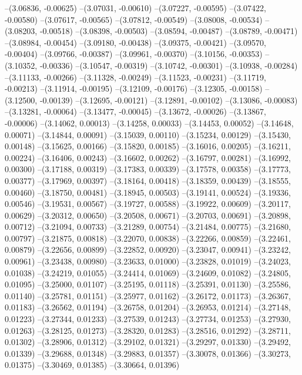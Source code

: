 --(3.06836, -0.00625)
--(3.07031, -0.00610)
--(3.07227, -0.00595)
--(3.07422, -0.00580)
--(3.07617, -0.00565)
--(3.07812, -0.00549)
--(3.08008, -0.00534)
--(3.08203, -0.00518)
--(3.08398, -0.00503)
--(3.08594, -0.00487)
--(3.08789, -0.00471)
--(3.08984, -0.00454)
--(3.09180, -0.00438)
--(3.09375, -0.00421)
--(3.09570, -0.00404)
--(3.09766, -0.00387)
--(3.09961, -0.00370)
--(3.10156, -0.00353)
--(3.10352, -0.00336)
--(3.10547, -0.00319)
--(3.10742, -0.00301)
--(3.10938, -0.00284)
--(3.11133, -0.00266)
--(3.11328, -0.00249)
--(3.11523, -0.00231)
--(3.11719, -0.00213)
--(3.11914, -0.00195)
--(3.12109, -0.00176)
--(3.12305, -0.00158)
--(3.12500, -0.00139)
--(3.12695, -0.00121)
--(3.12891, -0.00102)
--(3.13086, -0.00083)
--(3.13281, -0.00064)
--(3.13477, -0.00045)
--(3.13672, -0.00026)
--(3.13867, -0.00006)
--(3.14062, 0.00013)
--(3.14258, 0.00033)
--(3.14453, 0.00052)
--(3.14648, 0.00071)
--(3.14844, 0.00091)
--(3.15039, 0.00110)
--(3.15234, 0.00129)
--(3.15430, 0.00148)
--(3.15625, 0.00166)
--(3.15820, 0.00185)
--(3.16016, 0.00205)
--(3.16211, 0.00224)
--(3.16406, 0.00243)
--(3.16602, 0.00262)
--(3.16797, 0.00281)
--(3.16992, 0.00300)
--(3.17188, 0.00319)
--(3.17383, 0.00339)
--(3.17578, 0.00358)
--(3.17773, 0.00377)
--(3.17969, 0.00397)
--(3.18164, 0.00418)
--(3.18359, 0.00439)
--(3.18555, 0.00460)
--(3.18750, 0.00481)
--(3.18945, 0.00503)
--(3.19141, 0.00524)
--(3.19336, 0.00546)
--(3.19531, 0.00567)
--(3.19727, 0.00588)
--(3.19922, 0.00609)
--(3.20117, 0.00629)
--(3.20312, 0.00650)
--(3.20508, 0.00671)
--(3.20703, 0.00691)
--(3.20898, 0.00712)
--(3.21094, 0.00733)
--(3.21289, 0.00754)
--(3.21484, 0.00775)
--(3.21680, 0.00797)
--(3.21875, 0.00818)
--(3.22070, 0.00838)
--(3.22266, 0.00859)
--(3.22461, 0.00879)
--(3.22656, 0.00899)
--(3.22852, 0.00920)
--(3.23047, 0.00941)
--(3.23242, 0.00961)
--(3.23438, 0.00980)
--(3.23633, 0.01000)
--(3.23828, 0.01019)
--(3.24023, 0.01038)
--(3.24219, 0.01055)
--(3.24414, 0.01069)
--(3.24609, 0.01082)
--(3.24805, 0.01095)
--(3.25000, 0.01107)
--(3.25195, 0.01118)
--(3.25391, 0.01130)
--(3.25586, 0.01140)
--(3.25781, 0.01151)
--(3.25977, 0.01162)
--(3.26172, 0.01173)
--(3.26367, 0.01183)
--(3.26562, 0.01194)
--(3.26758, 0.01204)
--(3.26953, 0.01214)
--(3.27148, 0.01223)
--(3.27344, 0.01233)
--(3.27539, 0.01243)
--(3.27734, 0.01253)
--(3.27930, 0.01263)
--(3.28125, 0.01273)
--(3.28320, 0.01283)
--(3.28516, 0.01292)
--(3.28711, 0.01302)
--(3.28906, 0.01312)
--(3.29102, 0.01321)
--(3.29297, 0.01330)
--(3.29492, 0.01339)
--(3.29688, 0.01348)
--(3.29883, 0.01357)
--(3.30078, 0.01366)
--(3.30273, 0.01375)
--(3.30469, 0.01385)
--(3.30664, 0.01396)
